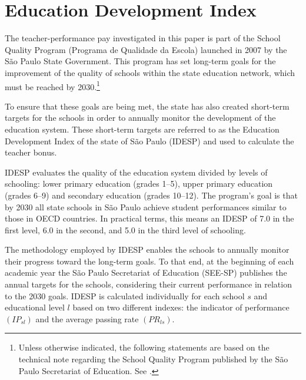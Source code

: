 \documentclass[a4paper, 12pt]{article}
\begin{document}

 


 








\section{Education Development Index} \label{IDESP}



The teacher-performance pay investigated in this paper is part of the School Quality Program (Programa de Qualidade da Escola) launched in 2007 by the São Paulo State Government. This program has set long-term goals for the improvement of the quality of schools within the state education network, which must be reached by 2030.\footnote{Unless otherwise indicated, the following statements are based on the technical note regarding the School Quality Program published by the São Paulo Secretariat of Education. See \citet{SEESP2018}.}

To ensure that these goals are being met, the state has also created short-term targets for the schools in order to annually monitor the development of the education system. These short-term targets are referred to as the Education Development Index of the state of São Paulo (IDESP) and used to calculate the teacher bonus.

IDESP evaluates the quality of the education system divided by levels of schooling: lower primary education (grades 1–5), upper primary education (grades 6–9) and secondary education (grades 10–12). The program's goal is that by 2030 all state schools in São Paulo achieve student performances similar to those in OECD countries. In practical terms, this means an IDESP of 7.0 in the first level, 6.0 in the second, and 5.0 in the third level of schooling.

The methodology employed by IDESP enables the schools to annually monitor their progress toward the long-term goals. To that end, at the beginning of each academic year the São Paulo Secretariat of Education (SEE-SP) publishes the annual targets for the schools, considering their current performance in relation to the 2030 goals. IDESP is calculated individually for each school $s$ and educational level $l$ based on two different indexes: the indicator of performance $(IP_{sl})$ and the average passing rate $(PR_{ls})$. 
\end{document}
